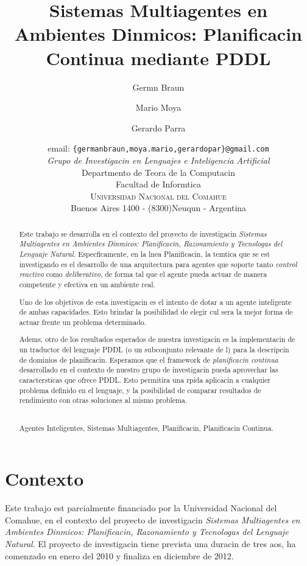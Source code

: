 \documentclass[a4paper,12pt,twocolumn]{article}
\title{Sistemas Multiagentes en Ambientes Dinmicos: Planificacin Continua mediante PDDL}
\author{
     Germn Braun \and Mario Moya \and Gerardo Parra\\
       }
\date{{\small email: {\tt \{germanbraun,moya.mario,gerardopar\}@gmail.com} }\\
\vspace{0.5cm}  \emph{Grupo de Investigacin en Lenguajes e Inteligencia Artificial}\\
    Departmento de Teora de la Computacin\\
        Facultad de Informtica\\
{\normalsize
\textsc{Universidad Nacional del Comahue}}\\ 
{\normalsize Buenos Aires 1400 - (8300)Neuqun - Argentina}
}
\begin{document}
\balance
\maketitle

\begin{abstract}
Este trabajo se desarrolla en el contexto del proyecto de
investigacin \emph{Sistemas Multiagentes en Ambientes Dinmicos: Planificacin, Razonamiento y Tecnologas del Lenguaje Natural}.
Especficamente, en la lnea Planificacin,
la temtica que se est investigando es el desarrollo de una
arquitectura para agentes que soporte tanto \emph{control reactivo}
como \emph{deliberativo}, de forma tal que el agente pueda actuar de
manera competente y efectiva en un am\-bien\-te real.

Uno de los objetivos de esta investigacin es el intento de dotar a un agente inteligente
de ambas capacidades. Esto brindar la posibilidad de elegir cul sera
la mejor forma de actuar frente un problema determinado.

Adems, otro de los resultados esperados de nuestra investigacin es la 
implementacin de un traductor del lenguaje PDDL (o un subconjunto relevante de l)
para la descripcin de dominios de planificacin. Esperamos que el framework
de \emph{planificacin continua} desarrollado en el contexto de nuestro grupo de
investigacin pueda aprovechar las caractersticas que ofrece PDDL. Esto permitira
una rpida aplicacin a cualquier problema definido en el lenguaje, y la posibilidad
de comparar resultados de rendimiento con otras soluciones al mismo problema.


\ \\
 {\sc Agentes Inteligentes, Sistemas Multiagentes, Planificacin, Planificacin Continua}.

\end{abstract}

\thispagestyle{empty}

\section*{Contexto}

Este trabajo est parcialmente financiado por la Universidad
Nacional del Comahue, en el contexto del proyecto de
investigacin 
\emph{Sistemas Multiagentes en Ambientes Dinmicos: Planificacin, Razonamiento y Tecnologas del Lenguaje Natural}.
El proyecto de investigacin tiene prevista una duracin de tres aos, ha comenzado en enero del 2010 y finaliza en diciembre de 2012.
\end{document}
